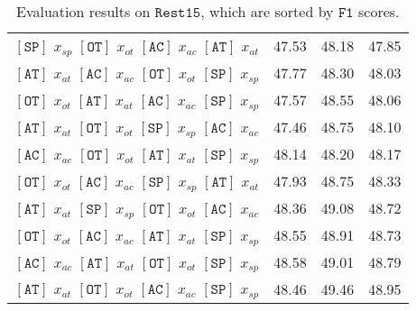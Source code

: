 \documentclass[11pt]{article}
\begin{document}
\begin{table*}[]
\begin{tabular}{c|ccc}
$\mathtt{[SP]}$ $x_{sp}$ $\mathtt{[OT]}$ $x_{ot}$ $\mathtt{[AC]}$ $x_{ac}$ $\mathtt{[AT]}$ $x_{at}$ & 47.53 & 48.18 & 47.85 \\
$\mathtt{[AT]}$ $x_{at}$ $\mathtt{[AC]}$ $x_{ac}$ $\mathtt{[OT]}$ $x_{ot}$ $\mathtt{[SP]}$ $x_{sp}$ & 47.77 & 48.30 & 48.03 \\
$\mathtt{[OT]}$ $x_{ot}$ $\mathtt{[AT]}$ $x_{at}$ $\mathtt{[AC]}$ $x_{ac}$ $\mathtt{[SP]}$ $x_{sp}$ & 47.57 & 48.55 & 48.06 \\
$\mathtt{[AT]}$ $x_{at}$ $\mathtt{[OT]}$ $x_{ot}$ $\mathtt{[SP]}$ $x_{sp}$ $\mathtt{[AC]}$ $x_{ac}$ & 47.46 & 48.75 & 48.10 \\
$\mathtt{[AC]}$ $x_{ac}$ $\mathtt{[OT]}$ $x_{ot}$ $\mathtt{[AT]}$ $x_{at}$ $\mathtt{[SP]}$ $x_{sp}$ & 48.14 & 48.20 & 48.17 \\
$\mathtt{[OT]}$ $x_{ot}$ $\mathtt{[AC]}$ $x_{ac}$ $\mathtt{[SP]}$ $x_{sp}$ $\mathtt{[AT]}$ $x_{at}$ & 47.93 & 48.75 & 48.33 \\
$\mathtt{[AT]}$ $x_{at}$ $\mathtt{[SP]}$ $x_{sp}$ $\mathtt{[OT]}$ $x_{ot}$ $\mathtt{[AC]}$ $x_{ac}$ & 48.36 & 49.08 & 48.72 \\
$\mathtt{[OT]}$ $x_{ot}$ $\mathtt{[AC]}$ $x_{ac}$ $\mathtt{[AT]}$ $x_{at}$ $\mathtt{[SP]}$ $x_{sp}$ & 48.55 & 48.91 & 48.73 \\
$\mathtt{[AC]}$ $x_{ac}$ $\mathtt{[AT]}$ $x_{at}$ $\mathtt{[OT]}$ $x_{ot}$ $\mathtt{[SP]}$ $x_{sp}$ & 48.58 & 49.01 & 48.79 \\
$\mathtt{[AT]}$ $x_{at}$ $\mathtt{[OT]}$ $x_{ot}$ $\mathtt{[AC]}$ $x_{ac}$ $\mathtt{[SP]}$ $x_{sp}$ & 48.46 & 49.46 & 48.95 \\
\bottomrule
    \end{tabular}
    \caption{Evaluation results on $\mathtt{Rest15}$, which are sorted by $\mathtt{F1}$ scores.}
    \label{table:rest15_appendix}
\end{table*}
\end{document}
